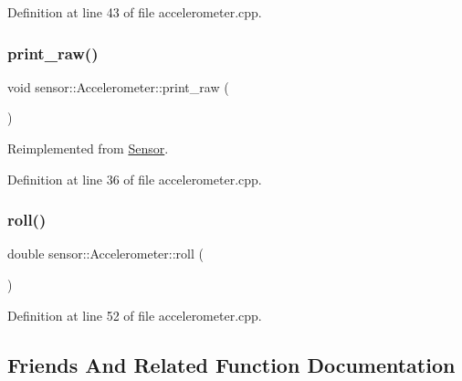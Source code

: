 Definition at line 43 of file accelerometer.\+cpp.

\mbox{\label{classsensor_1_1_accelerometer_a172c1bfe5d20071d5f3542a717797afa}} 
\subsubsection{\texorpdfstring{print\+\_\+raw()}{print\_raw()}}
{\footnotesize\ttfamily void sensor\+::\+Accelerometer\+::print\+\_\+raw (\begin{DoxyParamCaption}{ }\end{DoxyParamCaption})\hspace{0.3cm}{\ttfamily [virtual]}}



Reimplemented from \hyperlink{class_sensor_a6f16371eb71419f49ea1363ca81d0755}{Sensor}.



Definition at line 36 of file accelerometer.\+cpp.

\mbox{\label{classsensor_1_1_accelerometer_a63e28e79c1b08471c86f163033b04c5d}} 
\subsubsection{\texorpdfstring{roll()}{roll()}}
{\footnotesize\ttfamily double sensor\+::\+Accelerometer\+::roll (\begin{DoxyParamCaption}{ }\end{DoxyParamCaption})}



Definition at line 52 of file accelerometer.\+cpp.



\subsection{Friends And Related Function Documentation}
\mbox{\label{classsensor_1_1_accelerometer_af6581f59b9f71cabfa36a46d177deb5f}} 
